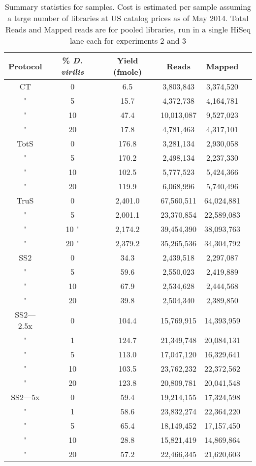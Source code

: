 \begin{table}[htdp]
\begin{center}
\begin{tabular}{|c|c|c|c|c|c|} \hline
Protocol & \% {\em D. virilis}  &  Yield (fmole) & Reads & Mapped \\\hline 
CT & 0  & 6.5  & 3,803,843 &3,374,520 \\
" &  5 & 15.7  & 4,372,738 &4,164,781 \\
" & 10 & 47.4  & 10,013,087 &9,527,023 \\
" & 20 & 17.8  & 4,781,463 &4,317,101 \\
TotS & 0  & 176.8  & 3,281,134 &2,930,058 \\
" &  5  & 170.2  & 2,498,134 &2,237,330 \\
" & 10  & 102.5  & 5,777,523 &5,424,366 \\
" & 20  & 119.9  & 6,068,996 &5,740,496 \\
TruS & 0  & 2,401.0  & 67,560,511 &64,024,881 \\
" &  5  & 2,001.1  & 23,370,854 &22,589,083 \\
" & 10 " & 2,174.2  & 39,454,390 &38,093,763 \\
" & 20 " & 2,379.2  & 35,265,536 &34,304,792 \\
SS2 & 0 & 34.3  & 2,439,518 &2,297,087 \\
" &  5 & 59.6  & 2,550,023 &2,419,889 \\
" & 10 & 67.9  & 2,534,628 &2,444,568 \\
" & 20 & 39.8  & 2,504,340 &2,389,850 \\
SS2---2.5x & 0 & 104.4  & 15,769,915 &14,393,959 \\
" &  1 & 124.7  & 21,349,748 &20,084,131 \\
" &  5 & 113.0  & 17,047,120 &16,329,641 \\
" & 10 & 103.5  & 23,762,232 &22,372,562 \\
" & 20 & 123.8  & 20,809,781 &20,041,548 \\
SS2---5x & 0 & 59.4  & 19,214,155 &17,324,598 \\
" &  1 & 58.6  & 23,832,274 &22,364,220 \\
" &  5 & 65.4  & 18,149,452 &17,157,450 \\
" & 10 & 28.8  & 15,821,419 &14,869,864 \\
" & 20 & 57.2  & 22,466,345 &21,620,603 \\
\hline
\end{tabular}
\label{tab:protocols}
\caption{Summary statistics for samples. Cost is estimated per sample assuming a
     large number of libraries at US catalog prices as of May 2014. Total Reads
     and Mapped reads are for pooled libraries, run in a single HiSeq lane each
     for experiments 2 and 3}
\end{center}
\end{table}
      
